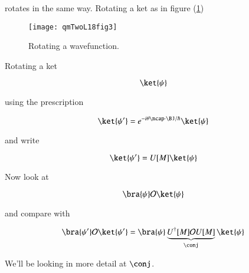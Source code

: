rotates in the same way.  Rotating a ket as in figure (\ref{fig:qmTwoL18:qmTwoL18fig3})
\begin{figure}[htp]
   \centering
   \texttt{[image: qmTwoL18fig3]}
   \caption{Rotating a wavefunction.}\label{fig:qmTwoL18:qmTwoL18fig3}
\end{figure}

Rotating a ket

\begin{equation}\label{eqn:qmTwoL18:470}
\ket{\psi}
\end{equation}

using the prescription

\begin{equation}\label{eqn:qmTwoL18:490}
\ket{\psi'} = e^{-i \theta \ncap \cdot \BJ/\hbar} \ket{\psi}
\end{equation}

and write

\begin{equation}\label{eqn:qmTwoL18:510}
\ket{\psi'} = U[M] \ket{\psi}
\end{equation}

Now look at 

\begin{equation}\label{eqn:qmTwoL18:530}
\bra{\psi} \mathcal{O} \ket{\psi}
\end{equation}

and compare with

\begin{equation}\label{eqn:qmTwoL18:550}
\bra{\psi'} \mathcal{O} \ket{\psi'}
=
\bra{\psi} \underbrace{U^\dagger[M] \mathcal{O} U[M]}_{\conj} \ket{\psi}
\end{equation}

We'll be looking in more detail at $\conj$.

\EndArticle
